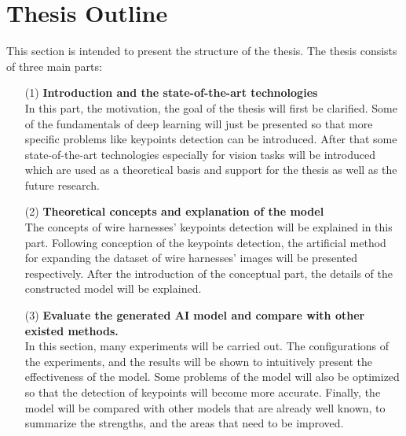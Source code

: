 \section{Thesis Outline}
This section is intended to present the structure of the thesis. The thesis consists of three main parts:
\begin{itemize}
    \item [(1)] \textbf{Introduction and the state-of-the-art technologies}\\ 
    In this part, the motivation, the goal of the thesis will first be clarified. 
    Some of the fundamentals of deep learning will just be presented so that more specific problems like keypoints detection can be introduced.
    After that some state-of-the-art technologies especially for vision tasks will be introduced which are used as a theoretical basis and support for the thesis 
    as well as the future research.
    \item [(2)] \textbf{Theoretical concepts and explanation of the model}\\ 
    The concepts of wire harnesses' keypoints detection will be explained in this part. Following conception of the keypoints detection, the artificial method 
    for expanding the dataset of wire harnesses' images will be presented respectively.
    After the introduction of the conceptual part, the details of the constructed model will be explained.
    \item [(3)] \textbf{Evaluate the generated AI model and compare with other existed methods.} \\ 
    In this section, many experiments will be carried out. The configurations of the experiments, and the results will be shown to intuitively present the 
    effectiveness of the model. Some problems of the model will also be optimized so that the detection of keypoints will become more accurate. 
    Finally, the model will be compared with other models that are already well known, to summarize the strengths, and the areas that need to be improved.
  \end{itemize}